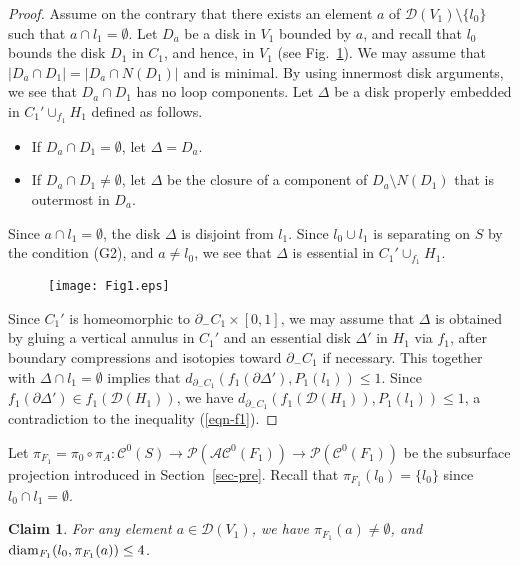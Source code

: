 \documentclass[]{aspm}
\newtheorem{claim}[definition]{Claim}
\begin{document}
\begin{proof}
Assume on the contrary that there exists an element $a$ of $\mathcal{D}(V_1)\setminus \{l_0\}$ such that $a\cap l_1=\emptyset$.
Let $D_a$ be a disk in $V_1$ bounded by $a$, and recall that $l_0$ bounds the disk $D_1$ in $C_1$, and hence, in $V_1$  (see Fig.~\ref{fig:1}).
We may assume that $|D_a\cap D_1|=|D_a\cap N(D_1)|$ and is minimal.
By using innermost disk arguments, we see that $D_a\cap D_1$ has no loop components.
Let $\Delta$ be a disk properly embedded in $C_1'\cup_{f_1} H_1$ defined as follows.
\begin{itemize}
\item If $D_a\cap D_1=\emptyset$, let $\Delta=D_a$.
\item If $D_a\cap D_1\ne\emptyset$, let $\Delta$ be the closure of a component of $D_a\setminus N(D_1)$ that is outermost in $D_a$.
\end{itemize}
Since $a\cap l_1=\emptyset$, the disk $\Delta$ is disjoint from $l_1$.
Since $l_{0}\cup l_{1}$ is separating on $S$ by the condition (G2), and $a\neq l_{0}$, we see that $\Delta$ is essential in $C_1'\cup_{f_1} H_1$.  

\begin{figure}[htbp]
 \begin{center}
 \texttt{[image: Fig1.eps]}
 \end{center}
 \caption{}
\label{fig:1}
\end{figure}
Since $C_1'$ is homeomorphic to $\partial_- C_1\times [0,1]$, we may assume that $\Delta$ is obtained by gluing a vertical annulus in $C_1'$ and an essential disk $\Delta'$ in $H_1$ via $f_1$, after boundary compressions and isotopies toward $\partial_- C_1$ if necessary.
This together with $\Delta\cap l_1=\emptyset$ implies that $d_{\partial_- C_1}(f_1(\partial \Delta'), P_1(l_1))\leq 1$.
Since $f_1(\partial \Delta')\in f_1(\mathcal{D}(H_1))$, we have $d_{\partial_- C_1}(f_1(\mathcal{D}(H_1)), P_1(l_1))\leq 1$, a contradiction to the inequality (\ref{eqn-f1}).
\end{proof}


Let $\pi_{F_1}=\pi_0\circ\pi_A:\mathcal{C}^{0}(S)\rightarrow \mathcal{P}(\mathcal{AC}^{0}(F_1))\rightarrow \mathcal{P}(\mathcal{C}^{0}(F_1))$ be the subsurface projection introduced in Section~\ref{sec-pre}.
Recall that $\pi_{F_1}(l_0)=\{l_0\}$ since $l_0\cap l_1=\emptyset$.

\begin{claim}\label{claim-l0-v1}
For any element $a\in \mathcal{D}(V_1)$, we have $\pi_{F_1}(a)\neq \emptyset$, and ${\rm diam}_{F_1}(l_0, \pi_{F_1}(a))\leq 4$. 
\end{claim}
\end{document}
